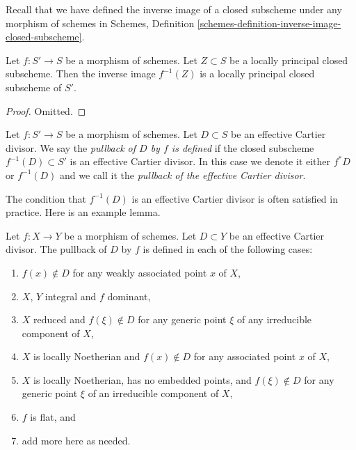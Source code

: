 \noindent
Recall that we have defined the inverse image of a closed subscheme
under any morphism of schemes in
Schemes, Definition \ref{schemes-definition-inverse-image-closed-subscheme}.

\begin{lemma}
\label{lemma-pullback-locally-principal}
Let $f : S' \to S$ be a morphism of schemes. Let $Z \subset S$
be a locally principal closed subscheme. Then the inverse image
$f^{-1}(Z)$ is a locally principal closed subscheme of $S'$.
\end{lemma}

\begin{proof}
Omitted.
\end{proof}

\begin{definition}
\label{definition-pullback-effective-Cartier-divisor}
Let $f : S' \to S$ be a morphism of schemes. Let $D \subset S$
be an effective Cartier divisor. We say the {\it pullback of
$D$ by $f$ is defined} if the closed subscheme $f^{-1}(D) \subset S'$
is an effective Cartier divisor. In this case we denote it either
$f^*D$ or $f^{-1}(D)$ and we call it the
{\it pullback of the effective Cartier divisor}.
\end{definition}

\noindent
The condition that $f^{-1}(D)$ is an effective Cartier divisor
is often satisfied in practice. Here is an example lemma.

\begin{lemma}
\label{lemma-pullback-effective-Cartier-defined}
Let $f : X \to Y$ be a morphism of schemes.
Let $D \subset Y$ be an effective Cartier divisor.
The pullback of $D$ by $f$ is defined in each of the following cases:
\begin{enumerate}
\item $f(x) \not \in D$ for any weakly associated point $x$ of $X$,
\item $X$, $Y$ integral and $f$ dominant,
\item $X$ reduced and $f(\xi) \not \in D$ for any generic point $\xi$ of any
irreducible component of $X$,
\item $X$ is locally Noetherian and $f(x) \not \in D$ for any associated point
$x$ of $X$,
\item $X$ is locally Noetherian, has no embedded points, and
$f(\xi) \not \in D$ for any generic point $\xi$ of an irreducible component of
$X$,
\item $f$ is flat, and
\item add more here as needed.
\end{enumerate}
\end{lemma}

